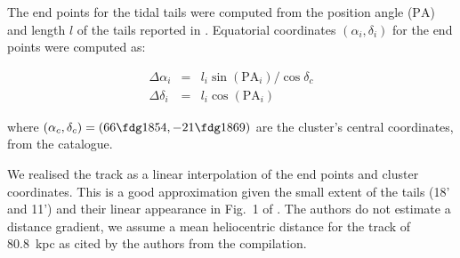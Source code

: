 The end points for the tidal tails were computed from the position angle ($\mathrm{PA}$) and length $l$ of the tails reported in \citet{Myeong2017}. Equatorial coordinates $(\alpha_i,\delta_i)$ for the end points were computed as:

\begin{eqnarray*}
\Delta\alpha_i & = & l_i\sin{(\mathrm{PA}_i)}/\cos{\delta_c} \\
\Delta\delta_i & = & l_i\cos{(\mathrm{PA}_i)}
\end{eqnarray*}

where $(\alpha_c,\delta_c)=(66\fdg1854,-21\fdg 1869)$ are the cluster's central coordinates, from the \citet{Harris1996} catalogue. 

We realised the track as a linear interpolation of the end points and cluster coordinates. This is a good approximation given the small extent of the tails (18' and 11') and their linear appearance in Fig.~1 of \citet{Myeong2017}. 
The authors do not estimate a distance gradient, we assume a mean heliocentric distance for the track of 80.8~kpc as cited by the authors from the \citet{Harris1996} compilation.
